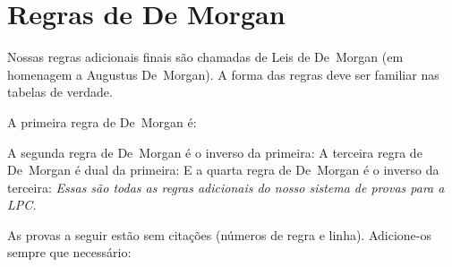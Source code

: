 
\section{Regras de De Morgan}
Nossas regras adicionais finais são chamadas de Leis de De~Morgan (em homenagem a Augustus De~Morgan). A forma das regras deve ser familiar nas tabelas de verdade.

 A primeira regra de De~Morgan é:
 
A segunda regra de De~Morgan é o inverso da primeira:
A terceira regra de De~Morgan é dual da primeira:
E a quarta regra de De~Morgan é o inverso da terceira:
\emph{Essas são todas as regras adicionais do nosso sistema de provas para a  LPC.}

\practiceproblems
\solutions
\problempart
\label{pr.justifyTFLproof}
As provas a seguir estão sem citações (números de regra e linha). Adicione-os sempre que necessário:

